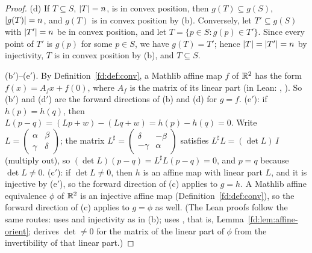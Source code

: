 \begin{proof}
(d) If $T\subseteq S$, $\lvert T\rvert=n$, is in convex position, then $g(T)\subseteq g(S)$, $\lvert g(T)\rvert=n$, and
$g(T)$ is in convex position by (b). Conversely, let $T'\subseteq g(S)$ with $\lvert T'\rvert=n$ be in convex
position, and let $T=\{p\in S:g(p)\in T'\}$. Since every point of $T'$ is $g(p)$ for some $p\in S$, we have
$g(T)=T'$; hence $\lvert T\rvert=\lvert T'\rvert=n$ by injectivity, $T$ is in convex position by (b), and $T\subseteq S$.

(b$'$)--(e$'$). By Definition~\ref{fd:def:conv}, a Mathlib affine map $f$ of $\mathbb R^2$ has the form
$f(x)=A_fx+f(0)$, where $A_f$ is the matrix of its linear part (in Lean:
, ). So
(b$'$) and (d$'$) are the forward directions of (b) and (d) for $g=f$. (e$'$): if $h(p)=h(q)$, then
$L(p-q)=(Lp+w)-(Lq+w)=h(p)-h(q)=0$. Write $L=\begin{pmatrix}\alpha&\beta\\ \gamma&\delta\end{pmatrix}$; the
matrix $L^\sharp=\begin{pmatrix}\delta&-\beta\\ -\gamma&\alpha\end{pmatrix}$ satisfies
$L^\sharp L=(\det L)\,I$ (multiply out), so $(\det L)(p-q)=L^\sharp L(p-q)=0$, and $p=q$ because
$\det L\ne0$. (c$'$): if $\det L\ne0$, then $h$ is an affine map with linear part $L$, and it is injective
by (e$'$), so the forward direction of (c) applies to $g=h$. A Mathlib affine equivalence $\phi$ of
$\mathbb R^2$ is an injective affine map (Definition~\ref{fd:def:conv}), so the forward direction of (c) applies
to $g=\phi$ as well. (The Lean proofs follow the same routes:
 uses  and injectivity as
in (b);  uses , that is,
Lemma~\ref{fd:lem:affine-orient};  derives
$\det\ne0$ for the matrix of the linear part of $\phi$ from the invertibility of that linear part.)
\end{proof}

